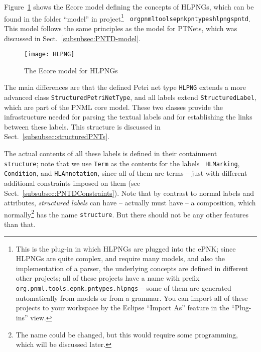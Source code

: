 Figure~\ref{fig:HLPNG-PNTD} shows the Ecore model defining the concepts of
HLPNGs, which can be found in the folder ``model'' in project\footnote
  {This is the plug-in in which HLPNGs are plugged into the ePNK; since HLPNGs
   are quite complex, and require many models, and also the implementation of
   a parser, the underlying concepts are defined in different other projects;
   all of these projects have a name with prefix {\tt
   org.pnml.tools.epnk.pntypes.hlpngs} -- some of them are generated
   automatically from models or from a grammar. You can import all
   of these projects to your workspace by the Eclipse ``Import As'' feature
   in the ``Plug-ins'' view.}
{\tt
org\qnsep{}pnml\qnsep{}tools\qnsep{}epnk\qnsep{}pntypes\qnsep{}hlpngs\qnsep{}pntd}.
This model follows the same principles as the model for PTNets, which was
discussed in Sect.~\ref{subsubsec:PNTD-model}.
%
\begin{figure} [btp!!] %
  \centerline{\texttt{[image: HLPNG]}}
  \caption{The Ecore model for HLPNGs}
  \label{fig:HLPNG-PNTD}
\end{figure}
%
The main differences are that the defined Petri net type {\tt HLPNG} extends a
more advanced class {\tt StructuredPetriNetType}, and all labels extend
{\tt StructuredLabel}, which are part of the PNML core model. These two classes
provide the infrastructure needed for parsing the textual labels and for
establishing the links between these labels. This structure is discussed
in Sect.~\ref{subsubsec:structuredPNTs}.  

The actual contents of all these labels is defined in their containment {\tt
structure}; note that we use {\tt Term} as the contents for the labels {\tt
HLMarking}, {\tt Condition}, and {\tt HLAnnotation}, since all of them are terms -- just
with different additional constraints imposed on them (see
Sect.~\ref{subsubsec:PNTDConstraints}).
Note that by contrast to normal labels and attributes, \emph{structured labels}
can have -- actually must have -- a composition, which normally\footnote
  {The name could be changed, but this would require some programming, which
   will be discussed later.}
has the name {\tt structure}. But there should not be any other features than
that.

